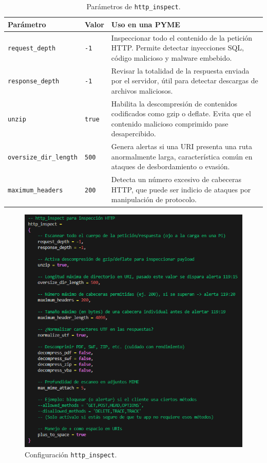 \documentclass[11pt,a4paper,twoside]{report}
\begin{document}
\begin{table}[ht]
	\centering
	\begin{tabular}{l l p{7cm}}
		\hline
		\textbf{Parámetro} & \textbf{Valor} & \textbf{Uso en una PYME}\\
		\hline
		\texttt{request\_depth}       & \texttt{-1} & Inspeccionar todo el contenido de la petición HTTP. Permite detectar inyecciones SQL, código malicioso y malware embebido.\\
		\texttt{response\_depth}      & \texttt{-1} & Revisar la totalidad de la respuesta enviada por el servidor, útil para detectar descargas de archivos maliciosos.\\
		\texttt{unzip}                & \texttt{true} & Habilita la descompresión de contenidos codificados como gzip o deflate. Evita que el contenido malicioso comprimido pase desapercibido.\\
		\texttt{oversize\_dir\_length}& \texttt{500} & Genera alertas si una URI presenta una ruta anormalmente larga, característica común en ataques de desbordamiento o evasión.\\
		\texttt{maximum\_headers}     & \texttt{200} & Detecta un número excesivo de cabeceras HTTP, que puede ser indicio de ataques por manipulación de protocolo.\\
		\hline
	\end{tabular}
	\caption{Parámetros de \texttt{http\_inspect}.}
\end{table}

\begin{figure}[H]
	\centering
	\includegraphics[scale=0.5]{http_inspect/4.png}
	\caption{Configuración \texttt{http\_inspect}.}
\end{figure}
\end{document}
